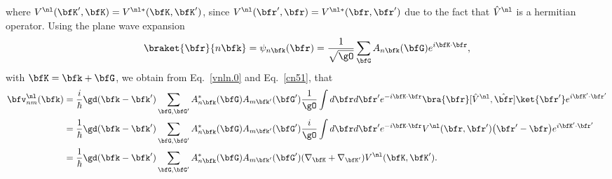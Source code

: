 where 
$V^\nl(\bfK',\bfK) =V^{\nl *}(\bfK,\bfK')$, since
$V^\nl(\bfr',\bfr)=V^{\nl*}(\bfr,\bfr')$ due to the fact that $\hat
V^\nl$ is a hermitian operator.
Using the 
plane wave expansion
\begin{align}\label{cn3}
\braket{\bfr}{n\bfk}=\psi_{n\bfk}(\bfr)=\frac{1}{\sqrt{\gO}}
\sum_{\bfG} A_{n\bfk}(\bfG)e^{i\bfK\cdot\bfr}
,
\end{align}
with $\bfK=\bfk+\bfG$, we
obtain from Eq.~\eqref{vnln.0} and Eq.~\eqref{cn51}, that
\begin{align}\label{vnln.2}
\bfv^\nl_{nm}(\bfk)
&=
\frac{i}{\hbar}
\gd(\bfk-\bfk')
\sum_{\bfG,\bfG'}
A^*_{n\bfk}(\bfG) 
A_{m\bfk'}(\bfG')
\frac{1}{\gO}
\int d\bfr d\bfr'
e^{-i\bfK\cdot\bfr}
\bra{\bfr}
[\hat V^\nl,\hat \bfr]
\ket{\bfr'}
e^{i\bfK'\cdot\bfr'}
\nonumber\\
&=
\frac{1}{\hbar}
\gd(\bfk-\bfk')
\sum_{\bfG,\bfG'}
A^*_{n\bfk}(\bfG) 
A_{m\bfk'}(\bfG')
\frac{i}{\gO}
\int d\bfr d\bfr'
e^{-i\bfK\cdot\bfr}
V^\nl(\bfr,\bfr')
\big(\bfr'-\bfr\big)
e^{i\bfK'\cdot\bfr'}
\nonumber\\
&=
\frac{1}{\hbar}
\gd(\bfk-\bfk')
\sum_{\bfG,\bfG'}
A^*_{n\bfk}(\bfG) 
A_{m\bfk'}(\bfG')
(\nabla_\bfK+\nabla_{\bfK'})
V^\nl(\bfK,\bfK')
.
\end{align}  

